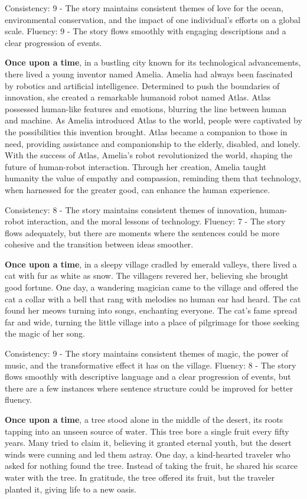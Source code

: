 \documentclass{article}
\begin{document}
Consistency: 9 - The story maintains consistent themes of love for the ocean, environmental conservation, and the impact of one individual's efforts on a global scale.
Fluency: 9 - The story flows smoothly with engaging descriptions and a clear progression of events.

\textbf{Once upon a time}, in a bustling city known for its technological advancements, there lived a young inventor named Amelia. Amelia had always been fascinated by robotics and artificial intelligence. Determined to push the boundaries of innovation, she created a remarkable humanoid robot named Atlas. Atlas possessed human-like features and emotions, blurring the line between human and machine. As Amelia introduced Atlas to the world, people were captivated by the possibilities this invention brought. Atlas became a companion to those in need, providing assistance and companionship to the elderly, disabled, and lonely. With the success of Atlas, Amelia's robot revolutionized the world, shaping the future of human-robot interaction. Through her creation, Amelia taught humanity the value of empathy and compassion, reminding them that technology, when harnessed for the greater good, can enhance the human experience.

Consistency: 8 - The story maintains consistent themes of innovation, human-robot interaction, and the moral lessons of technology.
Fluency: 7 - The story flows adequately, but there are moments where the sentences could be more cohesive and the transition between ideas smoother.

\textbf{Once upon a time}, in a sleepy village cradled by emerald valleys, there lived a cat with fur as white as snow. The villagers revered her, believing she brought good fortune. One day, a wandering magician came to the village and offered the cat a collar with a bell that rang with melodies no human ear had heard. The cat found her meows turning into songs, enchanting everyone. The cat's fame spread far and wide, turning the little village into a place of pilgrimage for those seeking the magic of her song.

Consistency: 9 - The story maintains consistent themes of magic, the power of music, and the transformative effect it has on the village.
Fluency: 8 - The story flows smoothly with descriptive language and a clear progression of events, but there are a few instances where sentence structure could be improved for better fluency.

\textbf{Once upon a time}, a tree stood alone in the middle of the desert, its roots tapping into an unseen source of water. This tree bore a single fruit every fifty years. Many tried to claim it, believing it granted eternal youth, but the desert winds were cunning and led them astray. One day, a kind-hearted traveler who asked for nothing found the tree. Instead of taking the fruit, he shared his scarce water with the tree. In gratitude, the tree offered its fruit, but the traveler planted it, giving life to a new oasis.
\end{document}
